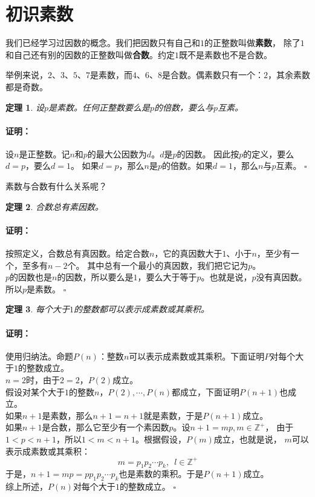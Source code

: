 \documentclass[12pt,UTF8]{ctexbook}
\newtheorem{tm}{定理}[section]
\newenvironment{proof2}{\paragraph{\textbf{证明：}}}{\hfill$\square$}
\begin{document}
\section{初识素数}
我们已经学习过因数的概念。我们把因数只有自己和$1$的正整数叫做\textbf{素数}，
除了$1$和自己还有别的因数的正整数叫做\textbf{合数}。约定$1$既不是素数也不是合数。

举例来说，$2$、$3$、$5$、$7$是素数，而$4$、$6$、$8$是合数。偶素数只有一个：$2$，其余素数都是奇数。

\begin{tm}\label{tm:1-0-0}
    设$p$是素数。任何正整数要么是$p$的倍数，要么与$p$互素。
\end{tm}
\begin{proof2}
    设$n$是正整数。记$n$和$p$的最大公因数为$d$。$d$是$p$的因数。
    因此按$p$的定义，要么$d = p$，要么$d = 1$。
    如果$d = p$，那么$n$是$p$的倍数。如果$d = 1$，那么$n$与$p$互素。
\end{proof2}

素数与合数有什么关系呢？

\begin{tm}\label{tm:1-0-4}
    合数总有素因数。
\end{tm}
\begin{proof2}
    按照定义，合数总有真因数。给定合数$n$，它的真因数大于$1$、小于$n$，至少有一个，至多有$n-2$个。
    其中总有一个最小的真因数，我们把它记为$p$。\\
    $p$的因数也是$n$的因数，所以要么是$1$，要么大于等于$p$。也就是说，$p$没有真因数。所以$p$是素数。
\end{proof2}

\begin{tm}\label{tm:1-0-6}
    每个大于$1$的整数都可以表示成素数或其乘积。
\end{tm}
\begin{proof2}
    使用归纳法。命题$P(n)$：整数$n$可以表示成素数或其乘积。下面证明$P$对每个大于$1$的整数成立。\\
    $n=2$时，由于$2 = 2$，$P(2)$成立。\\
    假设对某个大于$1$的整数$n$，$P(2), \cdots, P(n)$都成立，下面证明$P(n+1)$也成立。\\
    如果$n+1$是素数，那么$n+1 = n+1$就是素数，于是$P(n+1)$成立。\\
    如果$n+1$是合数，那么它至少有一个素因数$p$。设$n+1 = mp, m\in\mathbb{Z}^+$，
    由于$1<p<n+1$，所以$1< m < n+1$。根据假设，$P(m)$成立，也就是说，
    $m$可以表示成素数或其乘积：
    $$ m = p_1 p_2\cdots p_k, \,\,\, l\in\mathbb{Z}^+$$
    于是，$n+1 = mp = pp_1 p_2\cdots p_k$也是素数的乘积。于是$P(n+1)$成立。\\
    综上所述，$P(n)$对每个大于$1$的整数成立。
\end{proof2}
\end{document}
